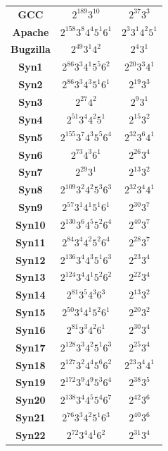 \documentclass[conference]{IEEEtran}
\theoremstyle{definition}
\begin{document}
\begin{table}[!ht]
\begin{tabular}{|c|c|c|}
    \textbf{GCC} & $2^{189}3^{10}$ & $2^{37}3^{3}$ \\
    \textbf{Apache} & $2^{158}3^{8}4^{4}5^{1}6^{1}$ & $2^{3}3^{1}4^{2}5^{1}$  \\
    \textbf{Bugzilla} & $2^{49}3^{1}4^{2}$ & $2^{4}3^{1}$ \\
    \textbf{Syn1} & $2^{86}3^{3}4^{1}5^{5}6^{2}$ & $2^{20}3^{3}4^{1}$ \\
    \textbf{Syn2} & $2^{86}3^{3}4^{3}5^{1}6^{1}$ & $2^{19}3^{3}$ \\
    \textbf{Syn3} & $2^{27}4^{2}$ & $2^{9}3^{1}$ \\
    \textbf{Syn4} & $2^{51}3^{4}4^{2}5^{1}$ & $2^{15}3^{2}$ \\
    \textbf{Syn5} & $2^{155}3^{7}4^{3}5^{5}6^{4}$ & $2^{32}3^{6}4^{1}$\\
    \textbf{Syn6} & $2^{73}4^{3}6^{1}$ & $2^{26}3^{4}$ \\
    \textbf{Syn7} & $2^{29}3^{1}$ & $2^{13}3^{2}$ \\
    \textbf{Syn8} & $2^{109}3^{2}4^{2}5^{3}6^{3}$ & $2^{32}3^{4}4^{1}$ \\
    \textbf{Syn9} & $2^{57}3^{1}4^{1}5^{1}6^{1}$ & $2^{30}3^{7}$ \\
    \textbf{Syn10} & $2^{130}3^{6}4^{5}5^{2}6^{4}$ & $2^{40}3^{7}$ \\
    \textbf{Syn11} & $2^{84}3^{4}4^{2}5^{2}6^{4}$ & $2^{28}3^{7}$\\
    \textbf{Syn12} & $2^{136}3^{4}4^{3}5^{1}6^{3}$ & $2^{23}3^{4}$ \\
    \textbf{Syn13} & $2^{124}3^{4}4^{1}5^{2}6^{2}$ & $2^{22}3^{4}$ \\
    \textbf{Syn14} & $2^{81}3^{5}4^{3}6^{3}$ & $2^{13}3^{2}$ \\
    \textbf{Syn15} & $2^{50}3^{4}4^{1}5^{2}6^{1}$ & $2^{20}3^{2}$ \\
    \textbf{Syn16} & $2^{81}3^{3}4^{2}6^{1}$ & $2^{30}3^{4}$\\
    \textbf{Syn17} & $2^{128}3^{3}4^{2}5^{1}6^{3}$ & $2^{25}3^{4}$ \\
    \textbf{Syn18} & $2^{127}3^{2}4^{4}5^{6}6^{2}$ & $2^{23}3^{4}4^{1}$ \\
    \textbf{Syn19} & $2^{172}3^{9}4^{9}5^{3}6^{4}$ & $2^{38}3^{5}$\\
    \textbf{Syn20} & $2^{138}3^{4}4^{5}5^{4}6^{7}$ & $2^{42}3^{6}$ \\
    \textbf{Syn21} & $2^{76}3^{3}4^{2}5^{1}6^{3}$ & $2^{40}3^{6}$ \\
    \textbf{Syn22} & $2^{72}3^{4}4^{1}6^{2}$ & $2^{31}3^{4}$\\

\end{tabular}
\end{table}
\end{document}
